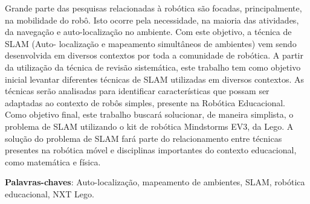 \begin{resumo}
 
 	Grande parte das pesquisas relacionadas à robótica são focadas, principalmente, na mobilidade do robô. Isto ocorre pela necessidade, na maioria das atividades, da
navegação e auto-localização no ambiente. Com este objetivo, a técnica de SLAM (Auto-
localização e mapeamento simultâneos de ambientes) vem sendo desenvolvida em diversos
contextos por toda a comunidade de robótica. A partir da utilização da técnica
de revisão sistemática, este trabalho tem como objetivo inicial levantar diferentes técnicas
de SLAM utilizadas em diversos contextos. As técnicas serão analisadas para identificar características que possam ser adaptadas ao contexto de robôs simples, presente na Robótica Educacional. Como objetivo final, este trabalho buscará solucionar, de maneira simplista, o problema de SLAM utilizando o kit de robótica Mindstorms EV3, da Lego. A solução do problema de SLAM fará parte do relacionamento entre técnicas presentes na robótica móvel e disciplinas importantes do contexto educacional, como matemática e física.

 \vspace{\onelineskip}
    
 \noindent
 \textbf{Palavras-chaves}: Auto-localização, mapeamento de ambientes, SLAM, robótica educacional, NXT Lego.
\end{resumo}
